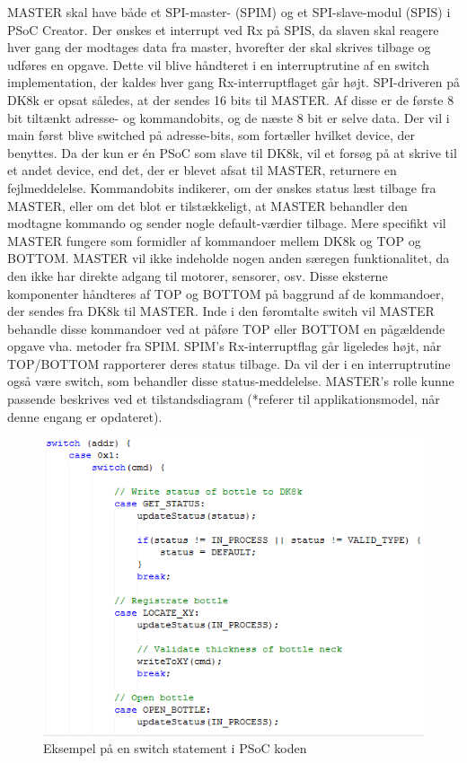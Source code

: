 MASTER skal have både et SPI-master- (SPIM) og et SPI-slave-modul (SPIS) i PSoC Creator. Der ønskes et interrupt ved Rx på SPIS, da slaven skal reagere
hver gang der modtages data fra master, hvorefter der skal skrives tilbage og udføres en opgave. Dette vil blive håndteret i en interruptrutine af en switch 
implementation, der kaldes hver gang Rx-interruptflaget går højt. SPI-driveren på DK8k er opsat således, at der sendes 16 bits til MASTER.
Af disse er de første 8 bit tiltænkt adresse- og kommandobits, og de næste 8 bit er selve data. Der vil i main først blive switched på adresse-bits,
som fortæller hvilket device, der benyttes. Da der kun er én PSoC som slave til DK8k, vil et forsøg på at skrive til et andet device, end det, der er blevet
afsat til MASTER, returnere en fejlmeddelelse. Kommandobits indikerer, om der ønskes status læst tilbage fra MASTER, eller om det blot er 
tilstækkeligt, at MASTER behandler den modtagne kommando og sender nogle default-værdier tilbage. Mere specifikt vil MASTER fungere som formidler af
kommandoer mellem DK8k og TOP og BOTTOM. MASTER vil ikke indeholde nogen anden særegen funktionalitet, da den ikke har direkte adgang til motorer, sensorer, osv.
Disse eksterne komponenter håndteres af TOP og BOTTOM på baggrund af de kommandoer, der sendes fra DK8k til MASTER. Inde i den føromtalte switch vil MASTER
behandle disse kommandoer ved at påføre TOP eller BOTTOM en pågældende opgave vha. metoder fra SPIM. SPIM's Rx-interruptflag går ligeledes højt, når
TOP/BOTTOM rapporterer deres status tilbage. Da vil der i en interruptrutine også være switch, som behandler disse status-meddelelse. MASTER's rolle kunne passende
beskrives ved et tilstandsdiagram (*referer til applikationsmodel, når denne engang er opdateret).

\begin{figure}[H]
\includegraphics[scale=0.9]{Screenshots/PSOC_switch}
\caption{Eksempel på en switch statement i PSoC koden}
\end{figure}

